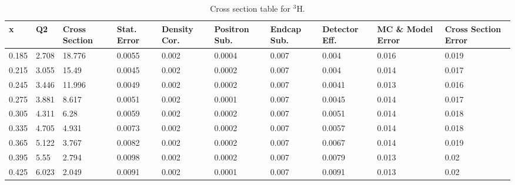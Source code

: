 \pagebreak
{}
\thispagestyle{lscape}
\pagestyle{lscape}
\begin{landscape}

\begin{table}	
\centering
\caption{Cross section table for $^3$H. }\label{CST_H3}
	\begin{tabular}{|p{1cm}|p{1cm}|p{1.5cm}|p{1.5cm}|p{2cm}|p{2cm}|p{1.5cm}|p{1.5cm}|p{2.5cm}|p{2.5cm}|}
		\hline
		x     & Q2     & Cross Section & Stat. Error & Density Cor. & Positron Sub. & Endcap Sub. & Detector Eff. & MC \& Model Error & Cross Section Error \\ \hline
		0.185 & 2.708  & 18.776        & 0.0055            & 0.002              & 0.0004               & 0.007              & 0.004                 & 0.016             & 0.019               \\ \hline
		0.215 & 3.055  & 15.49         & 0.0045            & 0.002              & 0.0002               & 0.007              & 0.004                 & 0.014             & 0.017               \\ \hline
		0.245 & 3.446  & 11.996        & 0.0049            & 0.002              & 0.0002               & 0.007              & 0.0041                & 0.013             & 0.016               \\ \hline
		0.275 & 3.881  & 8.617         & 0.0051            & 0.002              & 0.0001               & 0.007              & 0.0045                & 0.014             & 0.017               \\ \hline
		0.305 & 4.311  & 6.28          & 0.0059            & 0.002              & 0.0002               & 0.007              & 0.0051                & 0.014             & 0.018               \\ \hline
		0.335 & 4.705  & 4.931         & 0.0073            & 0.002              & 0.0002               & 0.007              & 0.0057                & 0.014             & 0.018               \\ \hline
		0.365 & 5.122  & 3.767         & 0.0082            & 0.002              & 0.0002               & 0.007              & 0.0067                & 0.014             & 0.019               \\ \hline
		0.395 & 5.55   & 2.794         & 0.0098            & 0.002              & 0.0002               & 0.007              & 0.0079                & 0.013             & 0.02                \\ \hline
		0.425 & 6.023  & 2.049         & 0.0091            & 0.002              & 0.0001               & 0.007              & 0.0091                & 0.013             & 0.02                \\ \hline

\end{tabular}
\end{table}
\end{landscape}
